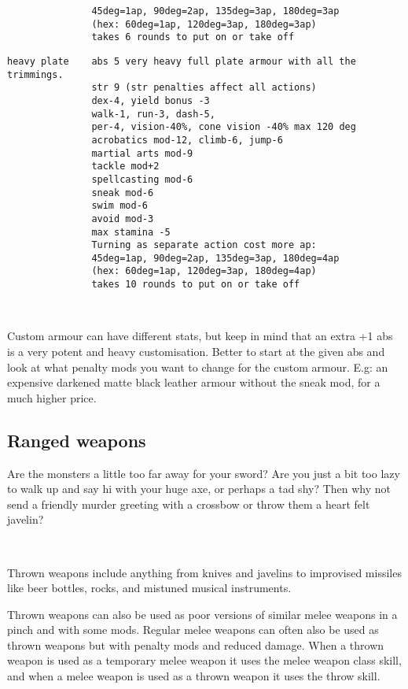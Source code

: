 \begin{samepage}
\begin{verbatim}
               45deg=1ap, 90deg=2ap, 135deg=3ap, 180deg=3ap
               (hex: 60deg=1ap, 120deg=3ap, 180deg=3ap)
               takes 6 rounds to put on or take off
\end{verbatim} \blocklistgap \begin{verbatim}
heavy plate    abs 5 very heavy full plate armour with all the trimmings.
               str 9 (str penalties affect all actions)
               dex-4, yield bonus -3
               walk-1, run-3, dash-5,
               per-4, vision-40%, cone vision -40% max 120 deg
               acrobatics mod-12, climb-6, jump-6
               martial arts mod-9
               tackle mod+2
               spellcasting mod-6
               sneak mod-6
               swim mod-6
               avoid mod-3
               max stamina -5
               Turning as separate action cost more ap:
               45deg=1ap, 90deg=2ap, 135deg=3ap, 180deg=4ap
               (hex: 60deg=1ap, 120deg=3ap, 180deg=4ap)
               takes 10 rounds to put on or take off
\end{verbatim} \end{samepage} \normalsize \goodbreak

\

Custom armour can have different stats, but keep in mind that an extra +1 abs is a very potent and heavy customisation. Better to start at the given abs and look at what penalty mods you want to change for the custom armour. E.g: an expensive darkened matte black leather armour without the sneak mod, for a much higher price.


\subsection*{Ranged weapons}
Are the monsters a little too far away for your sword? Are you just a bit too lazy to walk up and say hi with your huge axe, or perhaps a tad shy? Then why not send a friendly murder greeting with a crossbow or throw them a heart felt javelin?

\

\noindent Thrown weapons include anything from knives and javelins to improvised missiles like beer bottles, rocks, and mistuned musical instruments.

Thrown weapons can also be used as poor versions of similar melee weapons in a pinch and with some mods. Regular melee weapons can often also be used as thrown weapons but with penalty mods and reduced damage. When a thrown weapon is used as a temporary melee weapon it uses the melee weapon class skill, and when a melee weapon is used as a thrown weapon it uses the throw skill.


